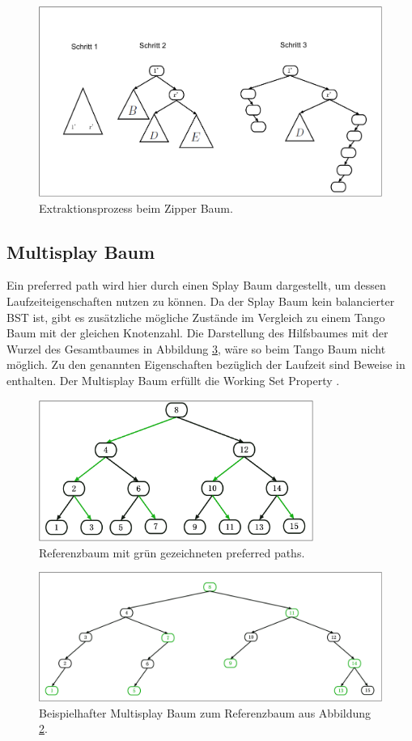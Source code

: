 \documentclass[a4paper,12pt]{article}
\begin{document}
\begin{figure}[H]
	\centering
	\includegraphics[height= 0.5\textwidth]{Medien/Zipper/hybrid/extractHybrid}
	\caption{Extraktionsprozess beim Zipper Baum. }
	\label{fig:extractHybrid}
\end{figure}
\subsection{Multisplay Baum}
Ein preferred path wird hier durch einen Splay Baum dargestellt, um dessen Laufzeiteigenschaften nutzen zu können. Da der Splay Baum kein balancierter BST ist, gibt es zusätzliche mögliche Zustände im Vergleich zu einem Tango Baum mit der gleichen Knotenzahl. Die Darstellung des Hilfsbaumes mit der Wurzel des Gesamtbaumes in Abbildung \ref{fig:pfadRepresentation}, wäre so beim Tango Baum nicht möglich. Zu den genannten Eigenschaften bezüglich der Laufzeit sind Beweise in \cite{multisplay} enthalten. Der Multisplay Baum erfüllt die Working Set Property \cite{porpMultiSplay}. 
\begin{figure}[H]
	\centering
	\includegraphics[width= 0.8\textwidth]{Medien/Multisplay/referenzTree}
	\caption {Referenzbaum mit grün gezeichneten preferred paths. }
	\label{fig:referenzTree}
\end{figure} 
\begin{figure}[H]
	\centering
	\includegraphics[width= 1\textwidth]{Medien/Multisplay/pfadRepresentation}
	\caption {Beispielhafter Multisplay Baum zum Referenzbaum aus Abbildung \ref{fig:referenzTree}.}
	\label{fig:pfadRepresentation}
\end{figure} 
\end{document}
